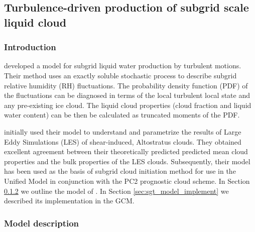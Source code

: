 \documentclass{UMDP_article}
\begin{document}
\subsection{Turbulence-driven production of subgrid scale liquid cloud}
\label{sec:turb_qcl_scheme}

\subsubsection{Introduction}\label{sec:sgt_intro}

\cite{fhfk14} developed a model for
subgrid liquid water production by turbulent motions.
Their method uses an exactly soluble
stochastic process to describe
subgrid relative humidity (RH) fluctuations.
The probability density function (PDF) of the fluctuations
can be diagnosed in terms of the local turbulent local state
and any pre-existing ice cloud. The
liquid cloud properties (cloud fraction and liquid water content)
can be then be calculated as truncated moments of the PDF.

\cite{fhfk14} initially used their model to
understand and parametrize the results of Large Eddy Simulations (LES)
of shear-induced, Altostratus clouds. They obtained excellent
agreement between their theoretically predicted predicted mean
cloud properties and the bulk properties of the LES clouds.
Subsequently, their model has been used as the basis of
subgrid cloud initiation method for use in the Unified Model
in conjunction with the PC2 prognostic cloud scheme. In Section \ref{sec:sgt_model_describe}
we outline the model of \cite{fhfk14}. In Section \ref{sec:sgt_model_implement}
we described its implementation in the GCM.


\subsubsection{Model description}
\label{sec:sgt_model_describe}
\end{document}
